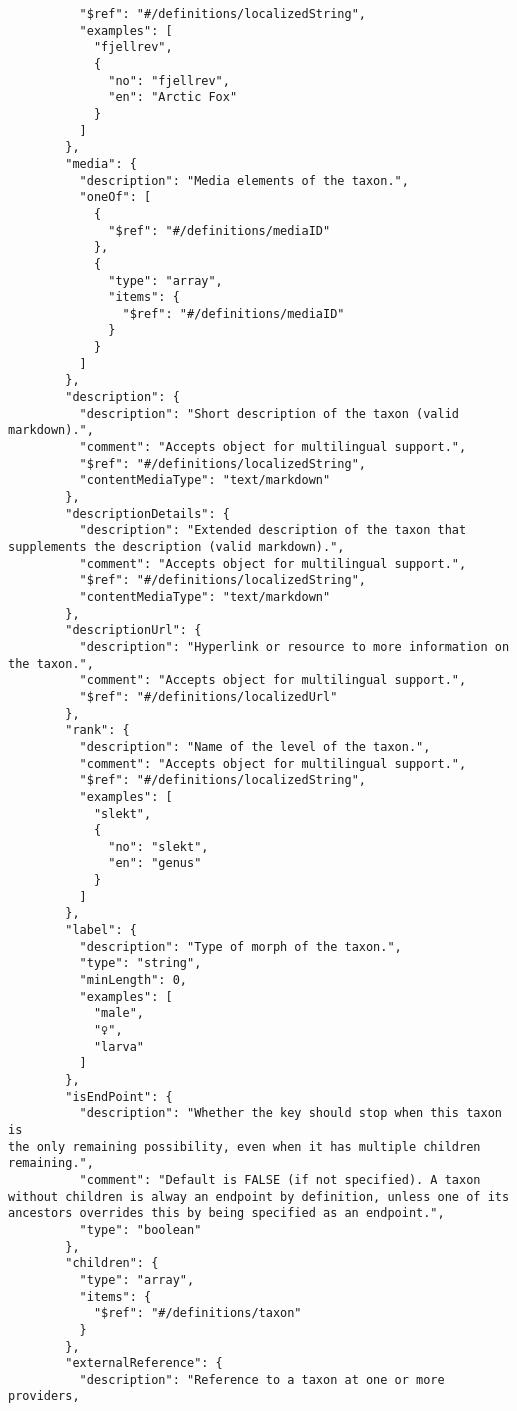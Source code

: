 \documentclass[10pt,letterpaper]{article}
\begin{document}
\begin{verbatim}
          "$ref": "#/definitions/localizedString",
          "examples": [
            "fjellrev",
            {
              "no": "fjellrev",
              "en": "Arctic Fox"
            }
          ]
        },
        "media": {
          "description": "Media elements of the taxon.",
          "oneOf": [
            {
              "$ref": "#/definitions/mediaID"
            },
            {
              "type": "array",
              "items": {
                "$ref": "#/definitions/mediaID"
              }
            }
          ]
        },
        "description": {
          "description": "Short description of the taxon (valid
markdown).",
          "comment": "Accepts object for multilingual support.",
          "$ref": "#/definitions/localizedString",
          "contentMediaType": "text/markdown"
        },
        "descriptionDetails": {
          "description": "Extended description of the taxon that
supplements the description (valid markdown).",
          "comment": "Accepts object for multilingual support.",
          "$ref": "#/definitions/localizedString",
          "contentMediaType": "text/markdown"
        },
        "descriptionUrl": {
          "description": "Hyperlink or resource to more information on
the taxon.",
          "comment": "Accepts object for multilingual support.",
          "$ref": "#/definitions/localizedUrl"
        },
        "rank": {
          "description": "Name of the level of the taxon.",
          "comment": "Accepts object for multilingual support.",
          "$ref": "#/definitions/localizedString",
          "examples": [
            "slekt",
            {
              "no": "slekt",
              "en": "genus"
            }
          ]
        },
        "label": {
          "description": "Type of morph of the taxon.",
          "type": "string",
          "minLength": 0,
          "examples": [
            "male",
            "♀",
            "larva"
          ]
        },
        "isEndPoint": {
          "description": "Whether the key should stop when this taxon is
the only remaining possibility, even when it has multiple children
remaining.",
          "comment": "Default is FALSE (if not specified). A taxon
without children is alway an endpoint by definition, unless one of its
ancestors overrides this by being specified as an endpoint.",
          "type": "boolean"
        },
        "children": {
          "type": "array",
          "items": {
            "$ref": "#/definitions/taxon"
          }
        },
        "externalReference": {
          "description": "Reference to a taxon at one or more providers,

\end{verbatim}
\end{document}
